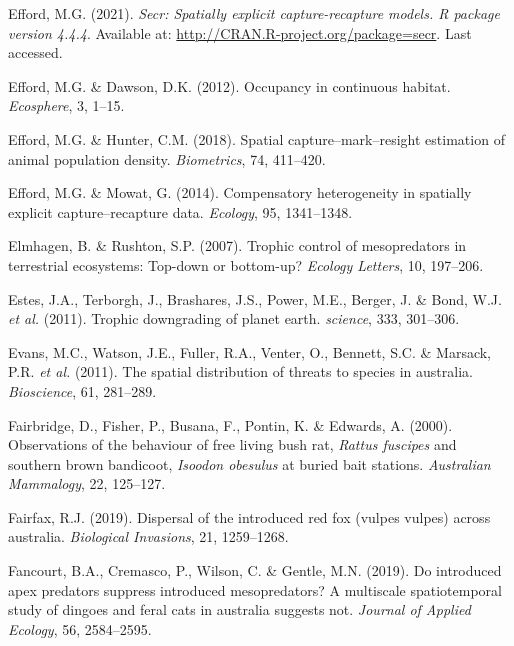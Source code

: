 \documentclass[11pt,a4paper,titlepage,twoside,openright]{style/unimelbthesis}
\begin{document}
\begin{mainmatter}
\leavevmode\hypertarget{ref-efford2021secr}{}%
Efford, M.G. (2021). \emph{Secr: Spatially explicit capture-recapture models. R package version 4.4.4}. Available at: \url{http://CRAN.R-project.org/package=secr}. Last accessed.

\leavevmode\hypertarget{ref-efford2012occupancy}{}%
Efford, M.G. \& Dawson, D.K. (2012). Occupancy in continuous habitat. \emph{Ecosphere}, 3, 1--15.

\leavevmode\hypertarget{ref-efford2018spatial}{}%
Efford, M.G. \& Hunter, C.M. (2018). Spatial capture--mark--resight estimation of animal population density. \emph{Biometrics}, 74, 411--420.

\leavevmode\hypertarget{ref-efford2014compensatory}{}%
Efford, M.G. \& Mowat, G. (2014). Compensatory heterogeneity in spatially explicit capture--recapture data. \emph{Ecology}, 95, 1341--1348.

\leavevmode\hypertarget{ref-elmhagen2007trophic}{}%
Elmhagen, B. \& Rushton, S.P. (2007). Trophic control of mesopredators in terrestrial ecosystems: Top-down or bottom-up? \emph{Ecology Letters}, 10, 197--206.

\leavevmode\hypertarget{ref-estes2011trophic}{}%
Estes, J.A., Terborgh, J., Brashares, J.S., Power, M.E., Berger, J. \& Bond, W.J. \emph{et al.} (2011). Trophic downgrading of planet earth. \emph{science}, 333, 301--306.

\leavevmode\hypertarget{ref-evans2011spatial}{}%
Evans, M.C., Watson, J.E., Fuller, R.A., Venter, O., Bennett, S.C. \& Marsack, P.R. \emph{et al.} (2011). The spatial distribution of threats to species in australia. \emph{Bioscience}, 61, 281--289.

\leavevmode\hypertarget{ref-fairbridge2000observations}{}%
Fairbridge, D., Fisher, P., Busana, F., Pontin, K. \& Edwards, A. (2000). Observations of the behaviour of free living bush rat, \emph{Rattus fuscipes} and southern brown bandicoot, \emph{Isoodon obesulus} at buried bait stations. \emph{Australian Mammalogy}, 22, 125--127.

\leavevmode\hypertarget{ref-fairfax2019dispersal}{}%
Fairfax, R.J. (2019). Dispersal of the introduced red fox (vulpes vulpes) across australia. \emph{Biological Invasions}, 21, 1259--1268.

\leavevmode\hypertarget{ref-fancourt2019introduced}{}%
Fancourt, B.A., Cremasco, P., Wilson, C. \& Gentle, M.N. (2019). Do introduced apex predators suppress introduced mesopredators? A multiscale spatiotemporal study of dingoes and feral cats in australia suggests not. \emph{Journal of Applied Ecology}, 56, 2584--2595.


\end{mainmatter}
\end{document}
